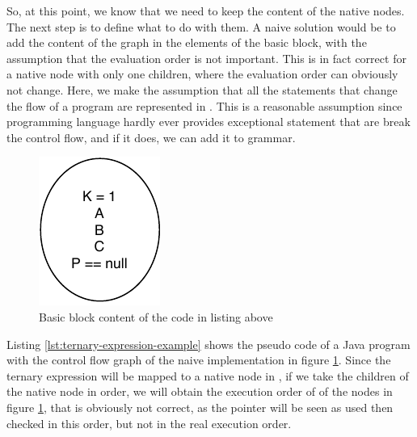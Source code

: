 So, at this point, we know that we need to keep the content of the native nodes. 
The next step is to define what to do with them. 
A naive solution would be to add the content of the graph in the elements of the basic block, with the assumption that the evaluation order is not important. 
This is in fact correct for a native node with only one children, where the evaluation order can obviously not change. 
Here, we make the assumption that all the statements that change the flow of a program are represented in \slang. 
This is a reasonable assumption since programming language hardly ever provides exceptional statement that are break the control flow, and if it does, we can add it to \slang grammar.



\begin{figure}[h]
	\caption{Basic block content of the code in listing above}
	\label{figure:basic-block-content}
	\includegraphics[]{figure/basic-block-content.pdf}
\end{figure}


Listing \ref{lst:ternary-expression-example} shows the pseudo code of a Java program with the control flow graph of the naive implementation in figure \ref{figure:basic-block-content}.
Since the ternary expression will be mapped to a native node in \slang, if we take the children of the native node in order, we will obtain the execution order of of the nodes in figure \ref{figure:basic-block-content}, that is obviously not correct, as the pointer will be seen as used then checked in this order, but not in the real execution order.

